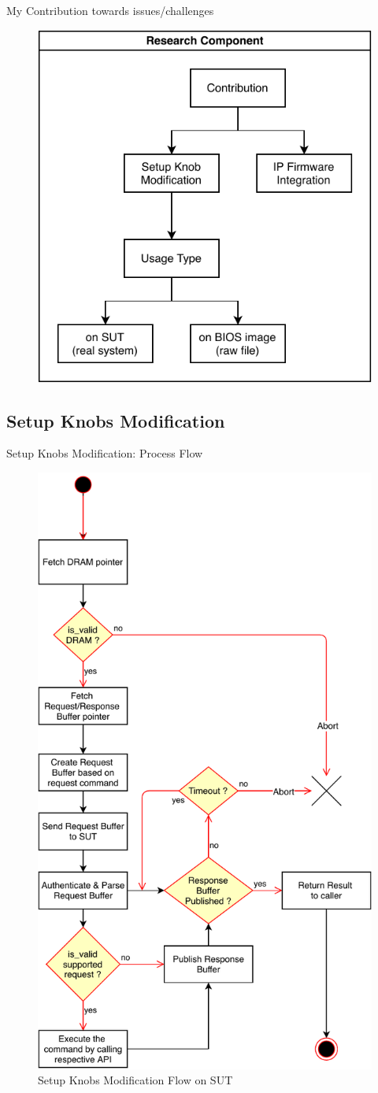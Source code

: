 
\begin{frame}{My Contribution towards issues/challenges}
  \begin{figure}
    \centering
    \includegraphics[width=0.6\linewidth]{Im/figures/research-component}
  \end{figure}
\end{frame}

\subsection{Setup Knobs Modification}
\begin{frame}[allowframebreaks]{Setup Knobs Modification: Process Flow}
  \begin{figure}[htbp]
    \centering
    \includegraphics[width=0.3\linewidth]{Im/figures/setup-knobs-flow}
    \caption{Setup Knobs Modification Flow on SUT}
    \label{fig:setup-knobs-flow}
  \end{figure}
\end{frame}

